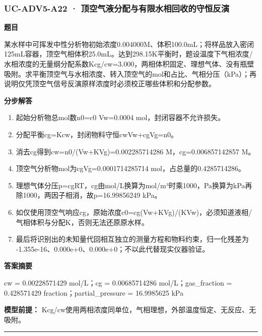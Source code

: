 \documentclass[UTF8,11pt,a4paper]{ctexart}
\begin{document}
\subsubsection*{UC-ADV5-A22 · 顶空气液分配与有限水相回收的守恒反演}
\noindent\textbf{题目}\par
某水样中可挥发中性分析物初始浓度0.004000M、体积100.0mL；将样品放入密闭125mL容器，顶空气相体积25.0mL。达到298.15K平衡时，题设温度下气相浓度/水相浓度的无量纲分配系数Kcg/cw=3.000，两相体积固定、理想气体、没有瓶壁吸附。求平衡顶空气与水相浓度、转入顶空气的mol和占比、气相分压（kPa）；再说明仅凭顶空气信号反演原样浓度时必须校正哪些体积和分配参数。\par
\medskip\noindent\textbf{分步解答}
\begin{enumerate}
\item 起始分析物总mol数n0=c0 Vw=0.0004 mol，封闭容器不允许损失。
\item 分配平衡cg=Kcw，封闭物料守恒cwVw+cgVg=n0。
\item 消去cg得到cw=n0/(Vw+KVg)=0.002285714286 M，cg=0.006857142857 M。
\item 顶空气分析物mol为cgVg=0.0001714285714 mol，占总量的0.4285714286。
\item 理想气体分压p=cgRT，cg由mol/L换算为mol/m³时乘1000，Pa换算为kPa再除1000，两因子相消，故p=16.99856249 kPa。
\item 如仅使用顶空气响应cg，原始浓度c0=cg(Vw+KVg)/(KVw)，必须知道液相/气相体积与分配K，否则无法还原原水样。
\item 最后将识别出的未知量代回相互独立的测量方程和物料约束，归一化残差为 -1.355e-16、0.000e+0、0.000e+0；不以此代替现实仪器验证。
\end{enumerate}
\noindent\textbf{答案摘要}\par
cw = 0.00228571429 mol/L；cg = 0.00685714286 mol/L；gas\_fraction = 0.428571429 fraction；partial\_pressure = 16.9985625 kPa\par
\noindent\textbf{模型前提：}
Kcg/cw使用两相浓度同单位，气相理想，外部温度恒定、无反应、无吸附。\par
\medskip\hrule\medskip
{}
\end{document}
